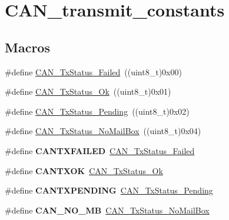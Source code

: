 \hypertarget{group___c_a_n__transmit__constants}{}\section{C\+A\+N\+\_\+transmit\+\_\+constants}
\label{group___c_a_n__transmit__constants}
\subsection*{Macros}
\begin{DoxyCompactItemize}
\item 
\#define \hyperlink{group___c_a_n__transmit__constants_ga8d193002e76c04ec8caff6b110cd5983}{C\+A\+N\+\_\+\+Tx\+Status\+\_\+\+Failed}~((uint8\+\_\+t)0x00)
\item 
\#define \hyperlink{group___c_a_n__transmit__constants_ga0b401c61922b1449de9b486dcf475c97}{C\+A\+N\+\_\+\+Tx\+Status\+\_\+\+Ok}~((uint8\+\_\+t)0x01)
\item 
\#define \hyperlink{group___c_a_n__transmit__constants_ga9678a3a51379422868083608c7394409}{C\+A\+N\+\_\+\+Tx\+Status\+\_\+\+Pending}~((uint8\+\_\+t)0x02)
\item 
\#define \hyperlink{group___c_a_n__transmit__constants_ga2620e99debd51011d3569121f2e44690}{C\+A\+N\+\_\+\+Tx\+Status\+\_\+\+No\+Mail\+Box}~((uint8\+\_\+t)0x04)
\item 
\hypertarget{group___c_a_n__transmit__constants_ga3590356d92f1a328dc794ac1f07d57d5}{}\#define {\bfseries C\+A\+N\+T\+X\+F\+A\+I\+L\+E\+D}~\hyperlink{group___c_a_n__transmit__constants_ga8d193002e76c04ec8caff6b110cd5983}{C\+A\+N\+\_\+\+Tx\+Status\+\_\+\+Failed}\label{group___c_a_n__transmit__constants_ga3590356d92f1a328dc794ac1f07d57d5}

\item 
\hypertarget{group___c_a_n__transmit__constants_ga288ba42cf1de7572f2fe1378268c9452}{}\#define {\bfseries C\+A\+N\+T\+X\+O\+K}~\hyperlink{group___c_a_n__transmit__constants_ga0b401c61922b1449de9b486dcf475c97}{C\+A\+N\+\_\+\+Tx\+Status\+\_\+\+Ok}\label{group___c_a_n__transmit__constants_ga288ba42cf1de7572f2fe1378268c9452}

\item 
\hypertarget{group___c_a_n__transmit__constants_ga76f43f4c54505b1f87b39b056ca38897}{}\#define {\bfseries C\+A\+N\+T\+X\+P\+E\+N\+D\+I\+N\+G}~\hyperlink{group___c_a_n__transmit__constants_ga9678a3a51379422868083608c7394409}{C\+A\+N\+\_\+\+Tx\+Status\+\_\+\+Pending}\label{group___c_a_n__transmit__constants_ga76f43f4c54505b1f87b39b056ca38897}

\item 
\hypertarget{group___c_a_n__transmit__constants_ga418f1fd7ca2e852b263fd07874fde0c6}{}\#define {\bfseries C\+A\+N\+\_\+\+N\+O\+\_\+\+M\+B}~\hyperlink{group___c_a_n__transmit__constants_ga2620e99debd51011d3569121f2e44690}{C\+A\+N\+\_\+\+Tx\+Status\+\_\+\+No\+Mail\+Box}\label{group___c_a_n__transmit__constants_ga418f1fd7ca2e852b263fd07874fde0c6}

\end{DoxyCompactItemize}


